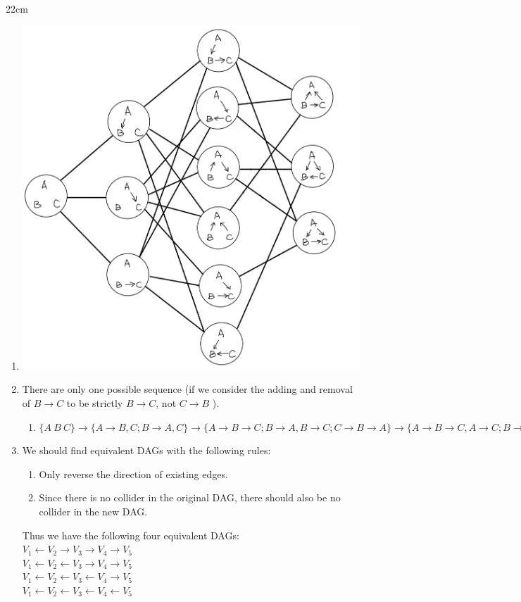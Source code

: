 \documentclass[11pt]{article}
\begin{document}
\begin{answertext}{22cm}{}
\begin{enumerate}
\item[(c)]
\includegraphics[scale=0.12]{graph}
\item[(d)]
There are only one possible sequence (if we consider the adding and removal of $B \to C$ to be strictly $B \to C$, not $C \to B$ ).
\begin{enumerate}
\item[(1)]
$\{A\ B\ C\} \to \{A \to B, C; B \to A, C\} \to \{A \to B \to C; B \to A, B \to C; C \to B \to A\} \to \{A \to B \to C, A \to C; B \to A \to C, B \to C\} \to \{B \to A \to C; A \to B, A \to C; C \to A \to B\}$
\end{enumerate}
\item[(e)]
We should find equivalent DAGs with the following rules:
\begin{enumerate}
\item[(1)] Only reverse the direction of existing edges.
\item[(2)] Since there is no collider in the original DAG, there should also be no collider in the new DAG.
\end{enumerate}
Thus we have the following four equivalent DAGs: \\
$V_{1} \leftarrow V_{2} \to V_{3} \to V_{4} \to V_{5}$ \\
$V_{1} \leftarrow V_{2} \leftarrow V_{3} \to V_{4} \to V_{5}$ \\
$V_{1} \leftarrow V_{2} \leftarrow V_{3} \leftarrow V_{4} \to V_{5}$ \\
$V_{1} \leftarrow V_{2} \leftarrow V_{3} \leftarrow V_{4} \leftarrow V_{5}$ \\
\end{enumerate}
\end{answertext}
\end{document}
